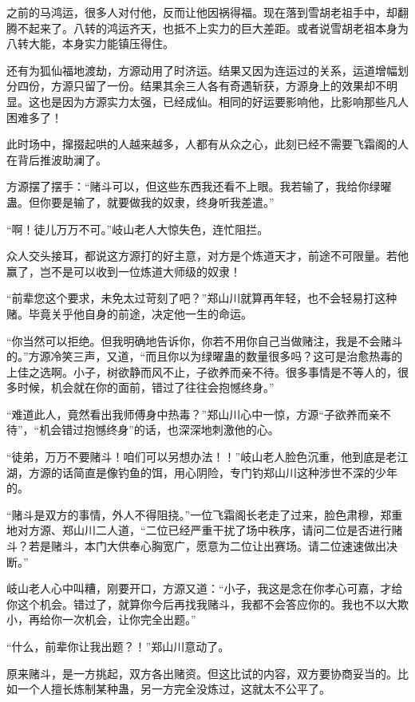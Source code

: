 \begin{this_body}
之前的马鸿运，很多人对付他，反而让他因祸得福。现在落到雪胡老祖手中，却翻腾不起来了。八转的鸿运齐天，也抵不上实力的巨大差距。或者说雪胡老祖本身为八转大能，本身实力能镇压得住。

还有为狐仙福地渡劫，方源动用了时济运。结果又因为连运过的关系，运道增幅划分四份，方源只留了一份。结果其余三人各有奇遇斩获，方源身上的效果却不明显。这也是因为方源实力太强，已经成仙。相同的好运要影响他，比影响那些凡人困难多了！

此时场中，撺掇起哄的人越来越多，人都有从众之心，此刻已经不需要飞霜阁的人在背后推波助澜了。

方源摆了摆手：“赌斗可以，但这些东西我还看不上眼。我若输了，我给你绿曜蛊。但你要是输了，就要做我的奴隶，终身听我差遣。”

“啊！徒儿万万不可。”岐山老人大惊失色，连忙阻拦。

众人交头接耳，都说这方源打的好主意，对方是个炼道天才，前途不可限量。若他赢了，岂不是可以收到一位炼道大师级的奴隶！

“前辈您这个要求，未免太过苛刻了吧？”郑山川就算再年轻，也不会轻易打这种赌。毕竟关乎他自身的前途，决定他一生的命运。

“你当然可以拒绝。但我明确地告诉你，你若不用你自己当做赌注，我是不会赌斗的。”方源冷笑三声，又道，“而且你以为绿曜蛊的数量很多吗？这可是治愈热毒的上佳之选啊。小子，树欲静而风不止，子欲养而亲不待。很多事情是不等人的，很多时候，机会就在你的面前，错过了往往会抱憾终身。”

“难道此人，竟然看出我师傅身中热毒？”郑山川心中一惊，方源“子欲养而亲不待”，“机会错过抱憾终身”的话，也深深地刺激他的心。

“徒弟，万万不要赌斗！咱们可以另想办法！！”岐山老人脸色沉重，他到底是老江湖，方源的话简直是像钓鱼的饵，用心阴险，专门钓郑山川这种涉世不深的少年的。

“赌斗是双方的事情，外人不得阻挠。”一位飞霜阁长老走了过来，脸色肃穆，郑重地对方源、郑山川二人道，“二位已经严重干扰了场中秩序，请问二位是否进行赌斗？若是赌斗，本门大供奉心胸宽广，愿意为二位让出赛场。请二位速速做出决断。”

岐山老人心中叫糟，刚要开口，方源又道：“小子，我这是念在你孝心可嘉，才给你这个机会。错过了，就算你今后再找我赌斗，我都不会答应你的。我也不以大欺小，再给你一次机会，让你完全出题。”

“什么，前辈你让我出题？！”郑山川意动了。

原来赌斗，是一方挑起，双方各出赌资。但这比试的内容，双方要协商妥当的。比如一个人擅长炼制某种蛊，另一方完全没炼过，这就太不公平了。


\end{this_body}
